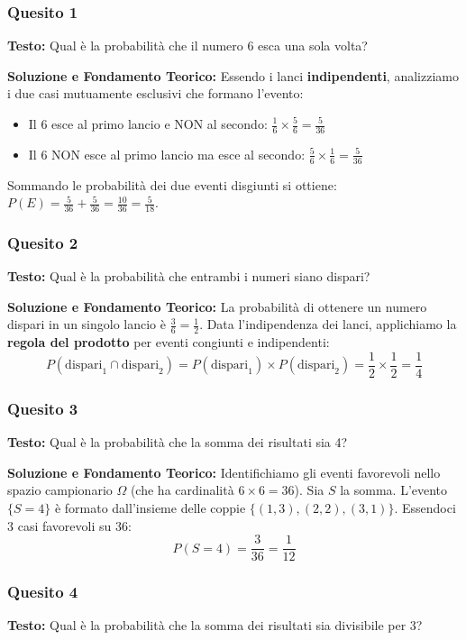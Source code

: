 \documentclass[12pt, a4paper]{article}
\begin{document}
\subsubsection*{Quesito 1}
\textbf{Testo:} Qual è la probabilità che il numero 6 esca una sola volta?

\textbf{Soluzione e Fondamento Teorico:} 
Essendo i lanci \textbf{indipendenti}, analizziamo i due casi mutuamente esclusivi che formano l'evento:
\begin{itemize}
    \item Il 6 esce al primo lancio e NON al secondo: $\frac{1}{6} \times \frac{5}{6} = \frac{5}{36}$
    \item Il 6 NON esce al primo lancio ma esce al secondo: $\frac{5}{6} \times \frac{1}{6} = \frac{5}{36}$
\end{itemize}
Sommando le probabilità dei due eventi disgiunti si ottiene: $P(E) = \frac{5}{36} + \frac{5}{36} = \frac{10}{36} = \frac{5}{18}$.

\subsubsection*{Quesito 2}
\textbf{Testo:} Qual è la probabilità che entrambi i numeri siano dispari?

\textbf{Soluzione e Fondamento Teorico:} 
La probabilità di ottenere un numero dispari in un singolo lancio è $\frac{3}{6} = \frac{1}{2}$. Data l'indipendenza dei lanci, applichiamo la \textbf{regola del prodotto} per eventi congiunti e indipendenti:
$$ P(\text{dispari}_1 \cap \text{dispari}_2) = P(\text{dispari}_1) \times P(\text{dispari}_2) = \frac{1}{2} \times \frac{1}{2} = \frac{1}{4} $$

\subsubsection*{Quesito 3}
\textbf{Testo:} Qual è la probabilità che la somma dei risultati sia 4?

\textbf{Soluzione e Fondamento Teorico:} 
Identifichiamo gli eventi favorevoli nello spazio campionario $\Omega$ (che ha cardinalità $6 \times 6 = 36$). Sia $S$ la somma. L'evento $\{S = 4\}$ è formato dall'insieme delle coppie $\{(1,3), (2,2), (3,1)\}$. Essendoci 3 casi favorevoli su 36:
$$ P(S=4) = \frac{3}{36} = \frac{1}{12} $$

\subsubsection*{Quesito 4}
\textbf{Testo:} Qual è la probabilità che la somma dei risultati sia divisibile per 3?
\end{document}
